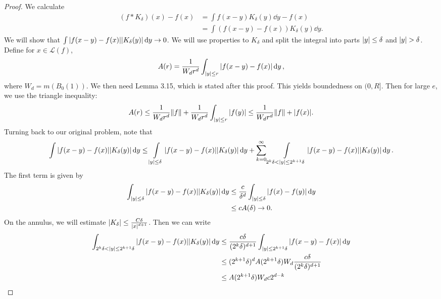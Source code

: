 \documentclass[leqno, openany]{memoir}
\theoremstyle{definition}
\theoremstyle{remark}
\theoremstyle{plain}
\theoremstyle{definition}
\theoremstyle{remark}
\newcommand{\mc}[1]{\mathcal{#1}}
\begin{document}
\begin{proof}
    We calculate 
    \begin{align*}
        (f * K_{\delta})(x) - f(x) &= \int f(x-y) K_{\delta}(y) \dd{y} - f(x) \\
                                   &= \int (f(x-y) - f(x)) K_{\delta}(y) \dd{y}.
    \end{align*}
    We will show that $\int \abs{f(x-y) - f(x)} \abs{K_{\delta}(y)} \dd{y} \to 0$. We will use properties to $K_{\delta}$ and split the integral into parts $\abs{y} \leq \delta$ and $\abs{y} > \delta$. Define for $x \in \mc{L}(f)$, 
    \[ A(r) = \frac{1}{W_d r^d} \int_{\abs{y} \leq r} \abs{f(x-y) - f(x)} \dd{y}, \]
    where $W_d = m(B_0(1))$. We then need Lemma 3.15, which is stated after this proof. This yields boundedness on $(0,R]$. Then for large $e$, we use the triangle inequality:
    \[ A(r) \leq \frac{1}{W_dr^d} \norm{f} + \frac{1}{W_dr^d} \int_{\abs{y} \leq r} \abs{f(y)} \leq \frac{1}{W_dr^d} \norm{f} + \abs{f(x)}. \]
    Turning back to our original problem, note that
    \[ \int \abs{f(x-y) - f(x)} \abs{K_{\delta}(y)} \dd{y} \leq \int\displaylimits_{\abs{y} \leq \delta} \abs{f(x-y) - f(x)} \abs{K_{\delta}(y)} \dd{y} + \sum_{k=0}^{\infty} \int\displaylimits_{2^k \delta < \abs{y} \leq 2^{k+1} \delta} \abs{f(x-y) - f(x)} \abs{K_{\delta}(y)} \dd{y}. \]
    The first term is given by
    \begin{align*}
        \int_{\abs{y} \leq \delta} \abs{f(x-y) - f(x)} \abs{K_{\delta}(y)} \dd{y} &\leq \frac{c}{\delta^d} \int_{\abs{y} \leq \delta} \abs{f(x) - f(y)} \dd{y} \\
                                                                                  &\leq c A(\delta) \to 0. 
    \end{align*}
    On the annulus, we will estimate $\abs{K_{\delta}} \leq \frac{C \delta}{\abs{x}^{d+1}}$. Then we can write
    \begin{align*}
        \int_{2^k \delta < \abs{y} \leq 2^{k+1} \delta} \abs{f(x-y) - f(x)} \abs{K_{\delta}(y)} \dd{y} &\leq \frac{c \delta}{(2^k \delta)^{d+1}} \int_{\abs{y} \leq 2^{k+1} \delta} \abs{f(x-y) - f(x)} \dd{y} \\
                                                                                                        &\leq (2^{k+1} \delta)^d A(2^{k+1}\delta) W_d \frac{c \delta}{(2^k\delta)^{d+1}} \\
                                                                                                        &\leq A(2^{k+1}\delta)W_d c 2^{d-k} \\

\end{align*}
\end{proof}
\end{document}

